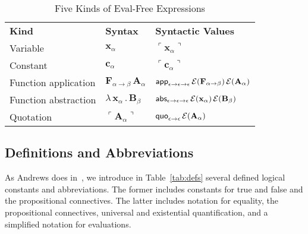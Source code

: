 \documentclass[fleqn]{llncs}
\newcommand{\bc}{\begin{center}}
\newcommand{\ec}{\end{center}}
\newcommand{\sE}{\mbox{$\cal E$}}
\newcommand{\synbrack}[1]{\ulcorner#1\urcorner}
\newcommand{\mname}[1]{\mbox{\sf #1}}
\newcommand{\mdot}{\mathrel.}
\newcommand{\tarrow}{\rightarrow}
\newcommand{\LambdaApp}{\lambda\,}
\begin{document}
\fi

\begin{table}[b]
\bc
\begin{tabular}{|lll|}
\hline

\textbf{Kind}
& \textbf{Syntax}
& \textbf{Syntactic Values}\\

Variable \hspace*{15ex}
& $\textbf{x}_\alpha$  \hspace*{9ex}
& $\synbrack{\textbf{x}_\alpha}$\\

Constant
& $\textbf{c}_\alpha$
& $\synbrack{\textbf{c}_\alpha}$\\

Function application
& $\textbf{F}_{\alpha \tarrow \beta} \, \textbf{A}_\alpha$
& $\mname{app}_{\epsilon \tarrow \epsilon \tarrow \epsilon} \,
  \sE(\textbf{F}_{\alpha \tarrow \beta}) \, \sE(\textbf{A}_\alpha)$\\

Function abstraction
& $\LambdaApp \textbf{x}_\alpha \mdot \textbf{B}_\beta$
& $\mname{abs}_{\epsilon \tarrow \epsilon \tarrow \epsilon} \,
  \sE(\textbf{x}_\alpha) \, \sE(\textbf{B}_\beta)$\\

Quotation
& $\synbrack{\textbf{A}_\alpha}$
& $\mname{quo}_{\epsilon \tarrow \epsilon} \, \sE(\textbf{A}_\alpha)$\\

\hline
\end{tabular}
\ec
\caption{Five Kinds of Eval-Free Expressions}\label{tab:eval-free-exprs}
\end{table}

\subsection{Definitions and Abbreviations} \label{subsec:definitions}

As Andrews does in~\cite[p.~212]{Andrews02}, we introduce in
Table~\ref{tab:defs} several defined logical constants and
abbreviations.  The former includes constants for true and false and
the propositional connectives.  The latter includes notation for
equality, the propositional connectives, universal and existential
quantification, and a simplified notation for evaluations.
\end{document}
